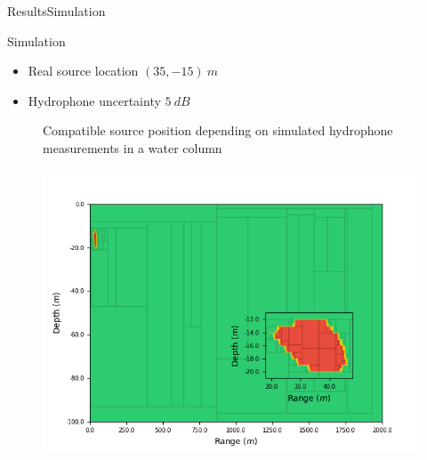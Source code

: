 \documentclass[9pt, xcolor={usenames, dvipsnames}]{beamer}
\begin{document}
			\begin{frame}{Results}{Simulation}
				\centering
				\begin{minipage}{0.6\textwidth}
					\begin{exampleblock}{Simulation}
						\begin{itemize}
							\item Real source location $(35, -15)\ m$
							\item Hydrophone uncertainty $5\ dB$
						\end{itemize}
					\end{exampleblock}
				\end{minipage}
				\begin{minipage}[c]{0.48\textwidth}
					\begin{figure}
						\caption{Compatible source position depending on simulated hydrophone measurements in a water column}
					\end{figure}
				\end{minipage}
				\hfill
				\begin{minipage}[c]{0.48\textwidth}
					\begin{figure}
						\includegraphics[width=\textwidth]{images/localisation/Localisation.png}

\end{figure}
\end{minipage}
\end{frame}
\end{document}
